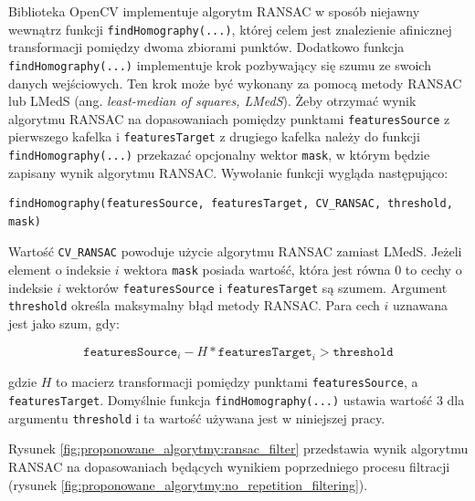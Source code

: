 Biblioteka OpenCV implementuje algorytm RANSAC w sposób niejawny wewnątrz funkcji \texttt{findHomography(...)}, której celem jest znalezienie afinicznej transformacji pomiędzy dwoma zbiorami punktów. Dodatkowo funkcja \texttt{findHomography(...)} implementuje krok pozbywający się szumu ze swoich danych wejściowych. Ten krok może być wykonany za pomocą metody RANSAC lub LMedS (ang. \textit{least-median of squares, LMedS}). Żeby otrzymać wynik algorytmu RANSAC na dopasowaniach pomiędzy punktami \texttt{featuresSource} z pierwszego kafelka i \texttt{featuresTarget} z drugiego kafelka należy do funkcji \texttt{findHomography(...)} przekazać opcjonalny wektor \texttt{mask}, w którym będzie zapisany wynik algorytmu RANSAC. Wywołanie funkcji wygląda następująco:
\begin{verbatim}
findHomography(featuresSource, featuresTarget, CV_RANSAC, threshold, mask)
\end{verbatim}
Wartość \texttt{CV\_RANSAC} powoduje użycie algorytmu RANSAC zamiast LMedS. Jeżeli element o indeksie $i$ wektora \texttt{mask} posiada wartość, która jest równa $0$ to cechy o indeksie $i$ wektorów \texttt{featuresSource} i \texttt{featuresTarget} są szumem. Argument \texttt{threshold} określa maksymalny błąd metody RANSAC. Para cech $i$ uznawana jest jako szum, gdy:

\begin{equation}
\texttt{featuresSource}_{i} - H * \texttt{featuresTarget}_{i} > \texttt{threshold}
\end{equation}

gdzie $H$ to macierz transformacji pomiędzy punktami \texttt{featuresSource}, a \texttt{featuresTarget}. Domyślnie funkcja \texttt{findHomography(...)} ustawia wartość $3$ dla argumentu \texttt{threshold} i ta wartość używana jest w niniejszej pracy.

Rysunek \ref{fig:proponowane_algorytmy:ransac_filter} przedstawia wynik algorytmu RANSAC na dopasowaniach będących wynikiem poprzedniego procesu filtracji (rysunek \ref{fig:proponowane_algorytmy:no_repetition_filtering}).


